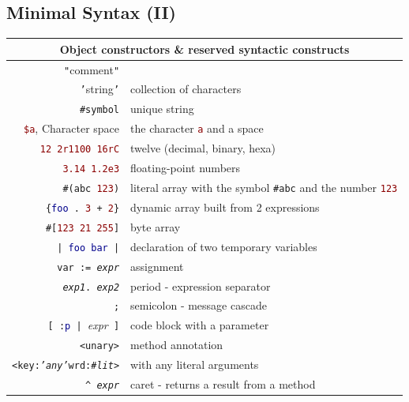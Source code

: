 \documentclass[notumble]{leaflet}
\newcommand{\code}[1]{\foreignlanguage{english}{\texttt{#1}}}
\begin{document}
\subsection{Minimal Syntax (II)}
\noindent
\begin{tabularx}{\linewidth}{@{}rX@{}}
        \toprule
        \multicolumn{2}{c}{Object constructors \& reserved syntactic constructs}\\
        \midrule
        \textcolor{comment}{\code{"}{comment}\code{"}}& \\
        \textcolor{string}{\code{'}{string}\code{'}}&collection of characters\\
        \textcolor{string}{\code{\#symbol}}&unique string \\
        \textcolor{darkRed}{\code{\$a}}, Character space & the character \textcolor{darkRed}{\code{a}} and a space \\
        \textcolor{darkRed}{\code{12 2r1100 16rC}} & twelve (decimal, binary, hexa)\\
        \textcolor{darkRed}{\code{3.14 1.2e3}}&floating-point numbers\\
        \code{\#(\textcolor{string}{abc} \textcolor{darkRed}{123})}&literal array with the symbol \textcolor{string}{\code{\#abc}} and the number \textcolor{darkRed}{\code{123}} \\
        \code{\{\textcolor{darkBlue}{foo}\,.\ \textcolor{darkRed}{3}\,+\,\textcolor{darkRed}{2}\}}&dynamic array built from 2 expressions\\
        \code{\#[\textcolor{darkRed}{123 21 255}]} &byte array \\ 
        \midrule
        
        \code{|\,\textcolor{darkBlue}{foo bar}\,|} &declaration of two temporary variables \\
        \code{var := \emph{expr}}&assignment \\
        \code{\emph{exp1}. \emph{exp2}} &period -  expression separator\\
        \code{;} &semicolon - message cascade\\
        \code{[\,:\textcolor{darkBlue}{p}\,|\,}\emph{expr}\code{\,]} &code block with a parameter \\
        \code{<unary>}&method annotation \\
        \code{<key:\emph{'any'}wrd:\emph{\#lit}>}&with any literal arguments\\
        \code{\textasciicircum\ \emph{expr}} &caret - returns a result from a method\\
        \bottomrule
\end{tabularx}
\end{document}
